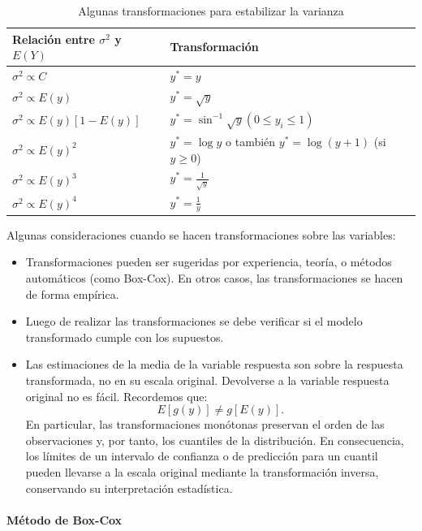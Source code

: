 \documentclass[
]{article}
\providecommand{\tightlist}{%
  \setlength{\itemsep}{0pt}\setlength{\parskip}{0pt}}
\begin{document}
\begin{table}

\caption{\label{tab:funcionesVar}Algunas transformaciones para estabilizar la varianza}
\centering
\begin{tabular}[t]{ll}
\toprule
Relación entre $\sigma^{2}$ y $E(Y)$ & Transformación\\
\midrule
$\sigma^{2} \propto C$ & $y^{*}=y$\\
$\sigma^{2} \propto E(y)$ & $y^{*}=\sqrt{y}$\\
$\sigma^{2} \propto E(y)[1-E(y)]$ & $y^{*}=\sin^{-1}\sqrt{y} (0 \leq y_{i} \leq 1)$\\
$\sigma^{2} \propto E(y)^{2}$ & $y^{*}=\log y$  o también  $y^{*}=\log (y+1)$ (si $y \geq 0$)\\
$\sigma^{2} \propto E(y)^{3}$ & $y^{*}=\frac{1}{\sqrt{y}}$\\
\addlinespace
$\sigma^{2} \propto E(y)^{4}$ & $y^{*}=\frac{1}{y}$\\
\bottomrule
\end{tabular}
\end{table}

Algunas consideraciones cuando se hacen transformaciones sobre las variables:

\begin{itemize}
\tightlist
\item
  Transformaciones pueden ser sugeridas por experiencia, teoría, o métodos automáticos (como Box-Cox). En otros casos, las transformaciones se hacen de forma empírica.
\item
  Luego de realizar las transformaciones se debe verificar si el modelo transformado cumple con los supuestos.
\item
  Las estimaciones de la media de la variable respuesta son sobre la respuesta transformada, no en su escala
  original. Devolverse a la variable respuesta original no es fácil. Recordemos que:
  \[
  E[g(y)] \neq g[E(y)].
  \]
  En particular, las transformaciones monótonas preservan el orden de las observaciones y, por tanto, los cuantiles de la distribución. En consecuencia, los límites de un intervalo de confianza o de predicción para un cuantil pueden llevarse a la escala original mediante la transformación inversa, conservando su interpretación estadística.
\end{itemize}

\paragraph*{Método de Box-Cox}\label{muxe9todo-de-box-cox}
\end{document}
